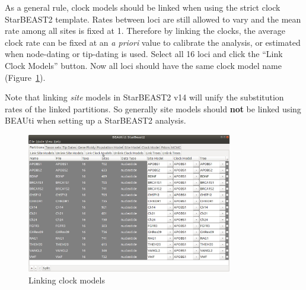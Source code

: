 \documentclass[12pt]{article}
\begin{document}
As a general rule, clock models should be linked when using the strict clock StarBEAST2 template. Rates between
loci are still allowed to vary and the mean rate among all sites is fixed at 1. Therefore
by linking the clocks, the average clock rate can be fixed at an \textit{a priori} value
to calibrate the analysis, or estimated when node-dating or tip-dating is used.
Select all 16 loci and click the ``Link Clock Models'' button. Now all loci
should have the same clock model name (Figure~\ref{fig:linkModels}).

Note that linking \textit{site} models in StarBEAST2 v14 will unify the substitution rates of
the linked partitions. So generally site models should \textbf{not} be linked using BEAUti
when setting up a StarBEAST2 analysis.

\begin{figure}[htb!]
\centering
\includegraphics[width=0.8\textwidth]{figures/linkModels.png}
\caption
{Linking clock models}
\label{fig:linkModels}
\end{figure}
\end{document}
